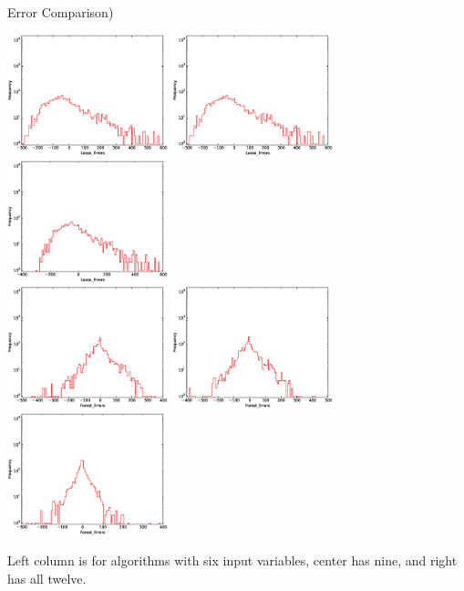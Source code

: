 \documentclass[pdf]{beamer}
\begin{document}
\begin{frame}{Error Comparison)}
\begin{center}
\includegraphics[width=0.35\textwidth]{plots/Lasso_Errors_6.eps}
\includegraphics[width=0.35\textwidth]{plots/Lasso_Errors_9.eps}
\includegraphics[width=0.35\textwidth]{plots/Lasso_Errors_12.eps}\\
\includegraphics[width=0.35\textwidth]{plots/Forest_Errors_6.eps}
\includegraphics[width=0.35\textwidth]{plots/Forest_Errors_9.eps}
\includegraphics[width=0.35\textwidth]{plots/Forest_Errors_12.eps}\\
\end{center}
\tiny Left column is for algorithms with six input variables, center has nine, and right has all twelve.
\end{frame}

\end{document}
